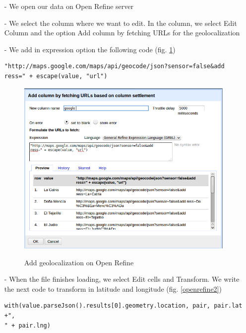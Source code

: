 \documentclass[10pt,a4paper]{article}
\begin{document}
\begin{itemize}
\item[-] We open our data on Open Refine server
\item[-] We select the column where we want to edit. In the column, we select Edit Column and the option Add column by fetching URLs for the geolocalization
\item[-]We add in expression option the following code (fig. \ref{openrefine1}) 
\begin{verbatim}
"http://maps.google.com/maps/api/geocode/json?sensor=false&add
ress=" + escape(value, "url")
\end{verbatim}

\begin{figure}[hdp]
\centering
\includegraphics[scale=0.50]{openrefine1.png}
\label{openrefine1}
\caption{Add geolocalization on Open Refine}
\end{figure}

\item[-] When the file finishes loading,  we select Edit cells and Transform. We write the next code to transform in latitude and longitude (fig. \ref{openrefine2})
\begin{verbatim}
with(value.parseJson().results[0].geometry.location, pair, pair.lat +",
" + pair.lng)
\end{verbatim}


\end{itemize}
\end{document}
